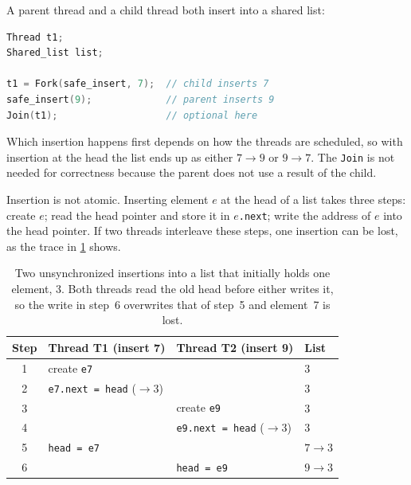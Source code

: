 \documentclass[../main.tex]{subfiles}
\begin{document}
\begin{example}
  A parent thread and a child thread both insert into a shared list:
  \begin{lstlisting}[language=C, numbers=none]
Thread t1;
Shared_list list;

t1 = Fork(safe_insert, 7);  // child inserts 7
safe_insert(9);             // parent inserts 9
Join(t1);                   // optional here
\end{lstlisting}
  Which insertion happens first depends on how the threads are scheduled,
  so with insertion at the head the list ends up as either $7\to 9$ or
  $9\to 7$.  The \texttt{Join} is not needed for correctness because the
  parent does not use a result of the child.
\end{example}

Insertion is not atomic.  Inserting element $e$ at the head of a list
takes three steps: create $e$; read the head pointer and store it in
$e$\texttt{.next}; write the address of $e$ into the head pointer.  If two
threads interleave these steps, one insertion can be lost, as the trace in
\cref{tab:l03-race} shows.

\begin{table}[htbp]
  \centering
  \caption{Two unsynchronized insertions into a list that initially holds
    one element, 3.  Both threads read the old head before either writes
    it, so the write in step~6 overwrites that of step~5 and element~7 is
    lost.}
  \label{tab:l03-race}
  \small
  \begin{tabular}{@{}clll@{}}
    \toprule
    Step & Thread T1 (insert 7) & Thread T2 (insert 9) & List \\
    \midrule
    1 & create \texttt{e7}           &                           & $3$ \\
    2 & \texttt{e7.next = head} ($\to 3$) &                      & $3$ \\
    3 &                              & create \texttt{e9}        & $3$ \\
    4 &                              & \texttt{e9.next = head} ($\to 3$) & $3$ \\
    5 & \texttt{head = e7}           &                           & $7\to 3$ \\
    6 &                              & \texttt{head = e9}        & $9\to 3$ \\
    \bottomrule
  \end{tabular}
\end{table}
\end{document}
